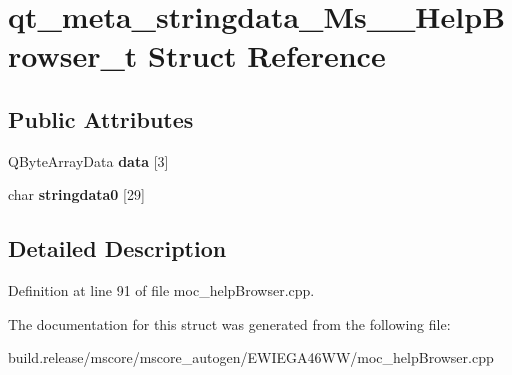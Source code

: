 \hypertarget{structqt__meta__stringdata___ms_____help_browser__t}{}\section{qt\+\_\+meta\+\_\+stringdata\+\_\+\+Ms\+\_\+\+\_\+\+Help\+Browser\+\_\+t Struct Reference}
\label{structqt__meta__stringdata___ms_____help_browser__t}
\subsection*{Public Attributes}
\begin{DoxyCompactItemize}
\item 
\mbox{\label{structqt__meta__stringdata___ms_____help_browser__t_a1be4e501421b679df96c2101d3bacfb0}} 
Q\+Byte\+Array\+Data {\bfseries data} \mbox{[}3\mbox{]}
\item 
\mbox{\label{structqt__meta__stringdata___ms_____help_browser__t_aa0fd9d938a4691e8f8907ebd530366f1}} 
char {\bfseries stringdata0} \mbox{[}29\mbox{]}
\end{DoxyCompactItemize}


\subsection{Detailed Description}


Definition at line 91 of file moc\+\_\+help\+Browser.\+cpp.



The documentation for this struct was generated from the following file\+:\begin{DoxyCompactItemize}
\item 
build.\+release/mscore/mscore\+\_\+autogen/\+E\+W\+I\+E\+G\+A46\+W\+W/moc\+\_\+help\+Browser.\+cpp\end{DoxyCompactItemize}
